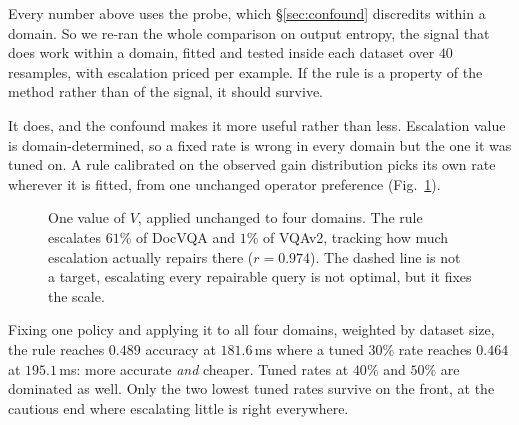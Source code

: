 \documentclass[10pt,twocolumn]{article}
\theoremstyle{plain}
\begin{document}
Every number above uses the probe, which \S\ref{sec:confound} discredits within
a domain. So we re-ran the whole comparison on output entropy, the signal that does work within a domain, fitted and tested inside each dataset over $40$
resamples, with escalation priced per example. If the rule is a property of the
method rather than of the signal, it should survive.

It does, and the confound makes it more useful rather than less. Escalation
value is domain-determined, so a fixed rate is wrong in every domain but the one
it was tuned on. A rule calibrated on the observed gain distribution picks its
own rate wherever it is fitted, from one unchanged operator preference
(Fig.~\ref{fig:transfer}).

\begin{figure}[t]
\centering
{}
\caption{One value of $V$, applied unchanged to four domains. The rule escalates
$61\%$ of DocVQA and $1\%$ of VQAv2, tracking how much escalation actually
repairs there ($r=0.974$). The dashed line is not a target, escalating every repairable query is not optimal, but it fixes the scale.}
\label{fig:transfer}
\end{figure}

Fixing one policy and applying it to all four domains, weighted by dataset size,
the rule reaches $0.489$ accuracy at $181.6$\,ms where a tuned $30\%$ rate
reaches $0.464$ at $195.1$\,ms: more accurate \emph{and} cheaper. Tuned rates at
$40\%$ and $50\%$ are dominated as well. Only the two lowest tuned rates survive
on the front, at the cautious end where escalating little is right everywhere.
\end{document}
